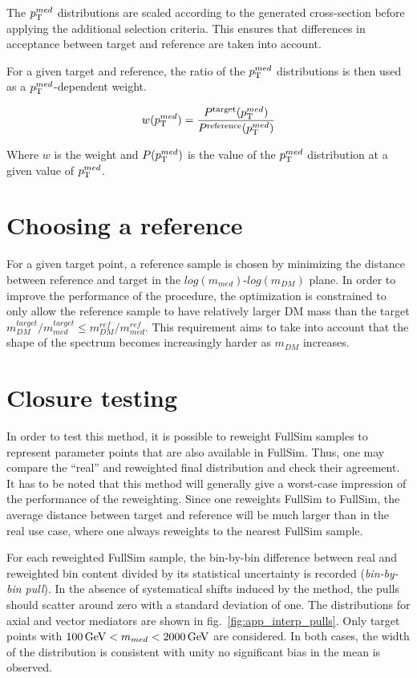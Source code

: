 The $p_{\mathrm{T}}^{med}$ distributions are scaled according to the generated cross-section before applying the additional selection criteria.
This ensures that differences in acceptance between target and reference are taken into account.

For a given target and reference, the ratio of the $p_{\mathrm{T}}^{med}$ distributions is then used as a $p_{\mathrm{T}}^{med}$-dependent weight.

$$ w(p_{\mathrm{T}}^{med}) = \frac{P^{\rm target}(p_{\mathrm{T}}^{med}) }{ P^{\rm reference}(p_{\mathrm{T}}^{med})}$$

Where $w$ is the weight and $P(p_{\mathrm{T}}^{med})$ is the value of the $p_{\mathrm{T}}^{med}$ distribution at a given value of $p_{\mathrm{T}}^{med}$.


\section{Choosing a reference}
For a given target point, a reference sample is chosen by minimizing the distance between reference and target in the $log(m_{med})$-$log(m_{DM})$ plane.
In order to improve the performance of the procedure, the optimization is constrained to only allow the reference sample to have relatively larger
DM mass than the target  $m_{DM}^{target} / m_{med}^{target}  \leq m_{DM}^{ref} / m_{med}^{ref}$. This requirement aims to take
into account that the shape of the \MET spectrum becomes increasingly harder as $m_{DM}$ increases.


\section{Closure testing}
In order to test this method, it is possible to reweight FullSim samples to represent parameter points that are also available in FullSim.
Thus, one may compare the ``real'' and reweighted final \MET distribution and check their agreement.
It has to be noted that this method will generally give a worst-case impression of the performance of the reweighting.
Since one reweights FullSim to FullSim, the average distance between target and reference will be much larger than in the
real use case, where one always reweights to the nearest FullSim sample.

For each reweighted FullSim sample, the bin-by-bin difference between real and reweighted bin content divided by its statistical uncertainty is recorded
(\textit{bin-by-bin pull}). In the absence of systematical shifts induced by the method, the pulls should scatter around zero with a standard deviation of one.
The distributions for axial and vector mediators are shown in fig.~\ref{fig:app_interp_pulls}. Only target points with $100\,\text{Ge\hspace{-.08em}V} < m_{med} < 2000\,\text{Ge\hspace{-.08em}V}$ are considered.
In both cases, the width of the distribution is consistent with unity no significant bias in the mean is observed.

